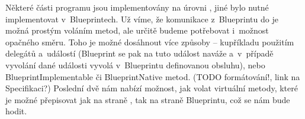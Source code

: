 Některé části programu jsou implementovány na úrovni \CPP{}, jiné bylo nutné implementovat v~Blueprintech. Už víme, že komunikace z~Blueprintu do \CPP{} je možná prostým voláním metod, ale určitě budeme potřebovat i~možnost opačného směru. Toho je možné dosáhnout více způsoby -- kupříkladu použitím delegátů a~událostí (Blueprint se pak na tuto událost naváže a~v~případě vyvolání dané události vyvolá v~Blueprintu definovanou obsluhu), nebo BlueprintImplementable či BlueprintNative metod. (TODO formátování!, link na Specifikaci?) Poslední dvě nám nabízí možnost, jak volat virtuální metody, které je možné přepisovat jak na straně \CPP{}, tak na straně Blueprintu, což se nám bude hodit.
